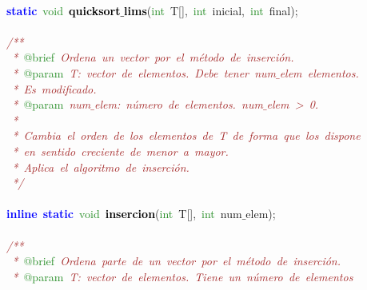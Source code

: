 \mbox{} \\
\mbox{}\textbf{\textcolor{Blue}{static}}\ \textcolor{ForestGreen}{void}\ \textbf{\textcolor{Black}{quicksort$\_$lims}}\textcolor{BrickRed}{(}\textcolor{ForestGreen}{int}\ T\textcolor{BrickRed}{[],}\ \textcolor{ForestGreen}{int}\ inicial\textcolor{BrickRed}{,}\ \textcolor{ForestGreen}{int}\ final\textcolor{BrickRed}{);} \\
\mbox{} \\
\mbox{}\textit{\textcolor{Brown}{/**}} \\
\mbox{}\textit{\textcolor{Brown}{\ *\ }}\textcolor{ForestGreen}{@brief}\textit{\textcolor{Brown}{\ Ordena\ un\ vector\ por\ el\ método\ de\ inserción.}} \\
\mbox{}\textit{\textcolor{Brown}{\ *\ }}\textcolor{ForestGreen}{@param}\textit{\textcolor{Brown}{\ T:\ vector\ de\ elementos.\ Debe\ tener\ num$\_$elem\ elementos.}} \\
\mbox{}\textit{\textcolor{Brown}{\ *\ Es\ modificado.}} \\
\mbox{}\textit{\textcolor{Brown}{\ *\ }}\textcolor{ForestGreen}{@param}\textit{\textcolor{Brown}{\ num$\_$elem:\ número\ de\ elementos.\ num$\_$elem\ \textgreater{}\ 0.}} \\
\mbox{}\textit{\textcolor{Brown}{\ *\ }} \\
\mbox{}\textit{\textcolor{Brown}{\ *\ Cambia\ el\ orden\ de\ los\ elementos\ de\ T\ de\ forma\ que\ los\ dispone}} \\
\mbox{}\textit{\textcolor{Brown}{\ *\ en\ sentido\ creciente\ de\ menor\ a\ mayor.}} \\
\mbox{}\textit{\textcolor{Brown}{\ *\ Aplica\ el\ algoritmo\ de\ inserción.}} \\
\mbox{}\textit{\textcolor{Brown}{\ */}} \\
\mbox{} \\
\mbox{}\textbf{\textcolor{Blue}{inline}}\ \textbf{\textcolor{Blue}{static}}\ \textcolor{ForestGreen}{void}\ \textbf{\textcolor{Black}{insercion}}\textcolor{BrickRed}{(}\textcolor{ForestGreen}{int}\ T\textcolor{BrickRed}{[],}\ \textcolor{ForestGreen}{int}\ num$\_$elem\textcolor{BrickRed}{);} \\
\mbox{} \\
\mbox{}\textit{\textcolor{Brown}{/**}} \\
\mbox{}\textit{\textcolor{Brown}{\ *\ }}\textcolor{ForestGreen}{@brief}\textit{\textcolor{Brown}{\ Ordena\ parte\ de\ un\ vector\ por\ el\ método\ de\ inserción.}} \\
\mbox{}\textit{\textcolor{Brown}{\ *\ }}\textcolor{ForestGreen}{@param}\textit{\textcolor{Brown}{\ T:\ vector\ de\ elementos.\ Tiene\ un\ número\ de\ elementos\ }} \\
